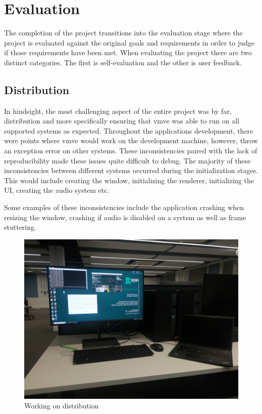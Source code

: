 \documentclass[11pt]{article}
\begin{document}
\section{Evaluation}
The completion of the project transitions into the evaluation stage where the
project is evaluated against the original goals and requirements in order to
judge if those requirements have been met. When evaluating the project there are
two distinct categories. The first is self-evaluation and the other is user
feedback.


\subsection{Distribution}
In hindsight, the most challenging aspect of the entire project was by far,
distribution and more specifically ensuring that \gls{vmve} was able to run on all
supported systems as expected. Throughout the applications development, there
were points where \gls{vmve} would work on the development machine, however,
throw an exception error on other systems. These inconsistencies paired with the
lack of reproducibility made these issues quite difficult to debug. The majority
of these inconsistencies between different systems occurred during the
initialization stages. This would include creating the window, initializing the
renderer, initializing the UI, creating the audio system etc.

Some examples of these inconsistencies include the application crashing when
resizing the window, crashing if audio is disabled on a system as well as frame
stuttering.

\begin{figure}[h!]
  \centering
  \includegraphics[width=\textwidth]{images/multiple_systems.png}
  \caption{Working on distribution}
  \label{fig:multiple_systems}
\end{figure}
\end{document}
